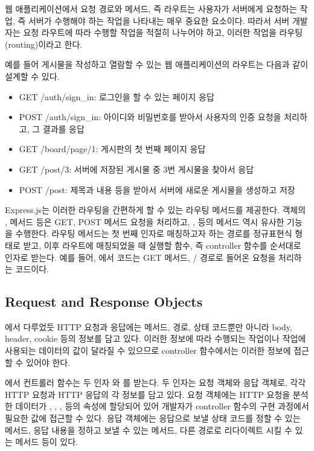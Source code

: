 웹 애플리케이션에서 요청 경로와 메서드, 즉 라우트는 사용자가 서버에게 요청하는 작업, 즉 서버가 수행해야 하는 작업을 나타내는 매우 중요한 요소이다. 따라서 서버 개발자는 요청 라우트에 따라 수행할 작업을 적절히 나누어야 하고, 이러한 작업을 라우팅(routing)이라고 한다.

예를 들어 게시물을 작성하고 열람할 수 있는 웹 애플리케이션의 라우트는 다음과 같이 설계할 수 있다.

\begin{itemize}
    \item GET /auth/sign\_in: 로그인을 할 수 있는 페이지 응답
    \item POST /auth/sign\_in: 아이디와 비밀번호를 받아서 사용자의 인증 요청을 처리하고, 그 결과를 응답
    \item GET /board/page/1: 게시판의 첫 번째 페이지 응답
    \item GET /post/3: 서버에 저장된 게시물 중 3번 게시물을 찾아서 응답
    \item POST /post: 제목과 내용 등을 받아서 서버에 새로운 게시물을 생성하고 저장
\end{itemize}

Express.js는 이러한 라우팅을 간편하게 할 수 있는 라우팅 메서드를 제공한다.  객체의 ,  메서드 등은 GET, POST 메서드 요청을 처리하고, ,  등의 메서드 역시 유사한 기능을 수행한다. 라우팅 메서드는 첫 번째 인자로 매칭하고자 하는 경로를 정규표현식 형태로 받고, 이후 라우트에 매칭되었을 때 실행할 함수, 즉 controller 함수를 순서대로 인자로 받는다. 예를 들어, 에서  코드는 GET 메서드, / 경로로 들어온 요청을 처리하는 코드이다.

\subsection*{Request and Response Objects}

에서 다루었듯 HTTP 요청과 응답에는 메서드, 경로, 상태 코드뿐만 아니라 body, header, cookie 등의 정보를 담고 있다. 이러한 정보에 따라 수행되는 작업이나 작업에 사용되는 데이터의 값이 달라질 수 있으므로 controller 함수에서는 이러한 정보에 접근할 수 있어야 한다.

에서 컨트롤러 함수는 두 인자 와 를 받는다. 두 인자는 요청 객체와 응답 객체로, 각각 HTTP 요청과  HTTP 응답의 각 정보를 담고 있다. 요청 객체에는 HTTP 요청을 분석한 데이터가 , , ,  등의 속성에 할당되어 있어 개발자가 controller 함수의 구현 과정에서 필요한 값에 접근할 수 있다. 응답 객체에는 응답으로 보낼 상태 코드를 정할 수 있는  메서드, 응답 내용을 정하고 보낼 수 있는  메서드, 다른 경로로 리다이렉트 시킬 수 있는  메서드 등이 있다.

